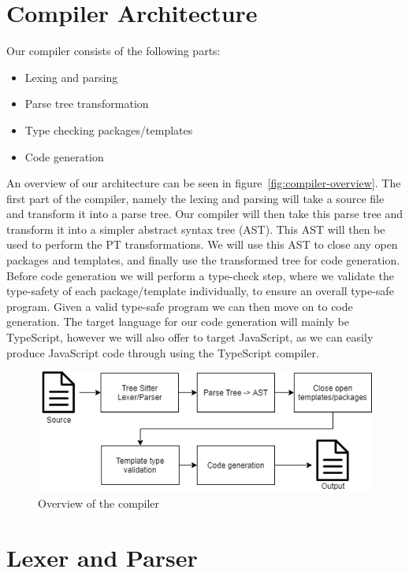 \section{Compiler Architecture}\label{sec:architecture}

Our compiler consists of the following parts:

\begin{itemize}
    \item Lexing and parsing
    \item Parse tree transformation
    \item Type checking packages/templates
    \item Code generation
\end{itemize}

An overview of our architecture can be seen in figure~\vref{fig:compiler-overview}.
The first part of the compiler, namely the lexing and parsing will take a source file and transform it into a parse tree.
Our compiler will then take this parse tree and transform it into a simpler abstract syntax tree (AST).
This AST will then be used to perform the PT transformations.
We will use this AST to close any open packages and templates, and finally use the transformed tree for code generation.
Before code generation we will perform a type-check step, where we validate the type-safety of each package/template individually, to ensure an overall type-safe program.
Given a valid type-safe program we can then move on to code generation.
The target language for our code generation will mainly be TypeScript, however we will also offer to target JavaScript, as we can easily produce JavaScript code through using the TypeScript compiler.

\begin{figure}
   \centering
   \includegraphics[scale=.75]{images/Compiler overview.png}
   \caption{Overview of the compiler}
   \label{fig:compiler-overview}
\end{figure}

\section{Lexer and Parser}\label{sec:lexer-and-parser}


